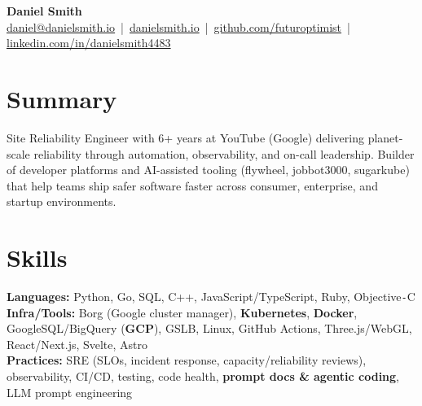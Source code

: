 \documentclass[10pt]{article}
\begin{document}
\begin{center}
    {\LARGE \textbf{Daniel Smith}}\\[-1mm]
    \href{mailto:daniel@danielsmith.io}{daniel@danielsmith.io} \,|\, 
    \href{https://danielsmith.io}{danielsmith.io} \,|\, 
    \href{https://github.com/futuroptimist}{github.com/futuroptimist} \,|\, 
    \href{https://linkedin.com/in/danielsmith4483}{linkedin.com/in/danielsmith4483}
\end{center}

\vspace{-2mm}
\section*{Summary}
Site Reliability Engineer with 6+ years at YouTube (Google) delivering planet-scale reliability
through automation, observability, and on-call leadership. Builder of developer platforms and
AI-assisted tooling (flywheel, jobbot3000, sugarkube) that help teams ship safer software faster
across consumer, enterprise, and startup environments.

\vspace{-2mm}
\section*{Skills}
\textbf{Languages:} Python, Go, SQL, C++, JavaScript/TypeScript, Ruby, Objective\texttt{-}C \\
\textbf{Infra/Tools:} Borg (Google cluster manager), \textbf{Kubernetes}, \textbf{Docker}, GoogleSQL/BigQuery (\textbf{GCP}), GSLB, Linux, GitHub Actions, Three.js/WebGL, React/Next.js, Svelte, Astro \\
\textbf{Practices:} SRE (SLOs, incident response, capacity/reliability reviews), observability, CI/CD, testing, code health, \textbf{prompt docs \& agentic coding}, LLM prompt engineering

\vspace{-2mm}
\end{document}
